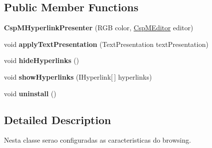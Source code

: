 \subsection*{Public Member Functions}
\begin{DoxyCompactItemize}
\item 
\mbox{\label{classcom_1_1fware_1_1cspdt_1_1cspm_1_1editor_1_1link_1_1_csp_m_hyperlink_presenter_a541fd9850be29c5430a23cdb024d478e}} 
{\bfseries Csp\+M\+Hyperlink\+Presenter} (R\+GB color, \hyperlink{classcom_1_1fware_1_1cspdt_1_1cspm_1_1editor_1_1_csp_m_editor}{Csp\+M\+Editor} editor)
\item 
\mbox{\label{classcom_1_1fware_1_1cspdt_1_1cspm_1_1editor_1_1link_1_1_csp_m_hyperlink_presenter_a3d4d225375ff24b3368818d3fe484795}} 
void {\bfseries apply\+Text\+Presentation} (Text\+Presentation text\+Presentation)
\item 
\mbox{\label{classcom_1_1fware_1_1cspdt_1_1cspm_1_1editor_1_1link_1_1_csp_m_hyperlink_presenter_a4f5bfa9693347282e18dd6ae0b3322a9}} 
void {\bfseries hide\+Hyperlinks} ()
\item 
\mbox{\label{classcom_1_1fware_1_1cspdt_1_1cspm_1_1editor_1_1link_1_1_csp_m_hyperlink_presenter_a2bae6d4110341490b8a0c7f24124fe09}} 
void {\bfseries show\+Hyperlinks} (I\+Hyperlink\mbox{[}$\,$\mbox{]} hyperlinks)
\item 
\mbox{\label{classcom_1_1fware_1_1cspdt_1_1cspm_1_1editor_1_1link_1_1_csp_m_hyperlink_presenter_a51ccf40b616673d9f19213dec7323114}} 
void {\bfseries uninstall} ()
\end{DoxyCompactItemize}


\subsection{Detailed Description}
Nesta classe serao configuradas as caracteristicas do browsing. 

